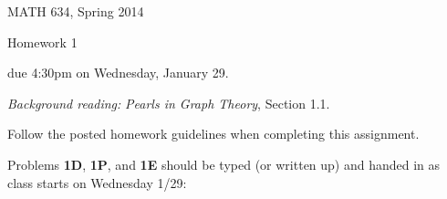 \documentclass[12pt]{article}
\begin{document}
\pagestyle{empty}

\begin{center}\large 
MATH 634, Spring 2014

{\sc Homework 1}

due 4:30{\sc pm} on Wednesday, January 29.
\end{center}

\noindent
{\em Background reading:} {\em Pearls in Graph Theory}, Section 1.1.

\smallskip\noindent
{\color{red} Follow the posted homework guidelines when completing this assignment.}

\smallskip\noindent
Problems {\bf 1D}, {\bf 1P}, and {\bf 1E} should be typed (or written up) and handed in as class starts on Wednesday 1/29:
\end{document}

